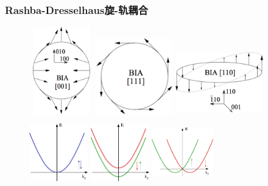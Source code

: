 \frame
{
	\frametitle{\textrm{Rashba-Dresselhaus}旋-轨耦合}
\begin{figure}[h!]
\centering
\vspace*{-0.05in}
\includegraphics[height=1.5in,width=1.10in,viewport=0 0 520 770,clip]{Figures/SOC_Rashba-Dresselhaus-2.png}
\includegraphics[height=1.3in,width=1.30in,viewport=0 0 590 590,clip]{Figures/SOC_Rashba-Dresselhaus-3.png}
\includegraphics[height=1.1in,width=1.50in,viewport=0 0 750 530,clip]{Figures/SOC_Rashba-Dresselhaus-4.png}
\includegraphics[height=1.2in,width=1.00in,viewport=0 0 390 500,clip]{Figures/SOC_Rashba-3.png}
\includegraphics[height=1.2in,width=1.00in,viewport=0 0 390 500,clip]{Figures/SOC_Rashba-4.png}
\includegraphics[height=1.2in,width=1.05in,viewport=0 0 490 500,clip]{Figures/SOC_Rashba-5.png}
\label{Rashba_effect_2}
\end{figure}
}
